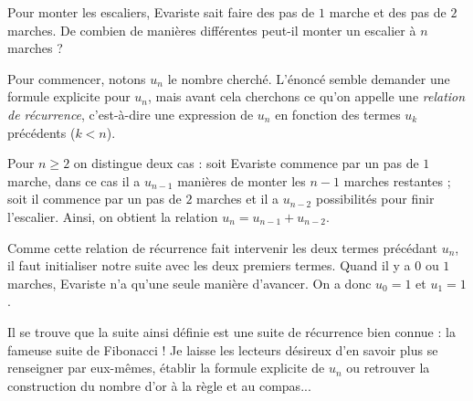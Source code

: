 \begin{exo}
Pour monter les escaliers, Evariste sait faire des pas de $1$ marche et des pas de $2$ marches. De combien de mani\`eres diff\'erentes peut-il monter un escalier à $n$ marches ?
\end{exo}

\begin{sol}
Pour commencer, notons $u_n$ le nombre cherch\'e. L'\'enonc\'e semble demander une formule explicite pour $u_n$, mais avant cela cherchons ce qu'on appelle une \emph{relation de r\'ecurrence}, c'est-à-dire une expression de $u_n$ en fonction des termes $u_k$ pr\'ec\'edents ($k < n$).

Pour $n\geq 2$ on distingue deux cas : soit Evariste commence par un pas de $1$ marche, dans ce cas il a $u_{n-1}$ mani\`eres de monter les $n-1$ marches restantes ; soit il commence par un pas de $2$ marches et il a $u_{n-2}$ possibilit\'es pour finir l'escalier. Ainsi, on obtient la relation $u_n = u_{n-1}+u_{n-2}$.

Comme cette relation de r\'ecurrence fait intervenir les deux termes pr\'ec\'edant $u_n$, il faut initialiser notre suite avec les deux premiers termes. Quand il y a $0$ ou $1$ marches, Evariste n'a qu'une seule mani\`ere d'avancer. On a donc $u_0=1$ et $u_1=1$.

Il se trouve que la suite ainsi d\'efinie est une suite de r\'ecurrence bien connue : la fameuse suite de Fibonacci ! Je laisse les lecteurs d\'esireux d'en savoir plus se renseigner par eux-m\^emes, \'etablir la formule explicite de $u_n$ ou retrouver la construction du nombre d'or à la r\`egle et au compas...
\end{sol}
